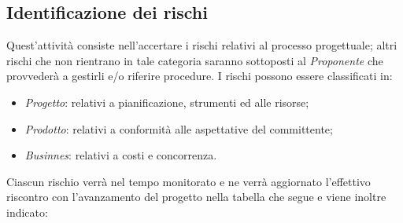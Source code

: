 \documentclass[12pt,a4paper,titlepage]{article}
\begin{document}
	\subsection{Identificazione dei rischi}
		Quest'attività consiste nell'accertare i rischi relativi al processo progettuale; altri rischi che non rientrano in tale categoria saranno sottoposti al \textit{Proponente} che provvederà a gestirli e/o riferire procedure.
		I rischi possono essere classificati in:
		\begin{itemize}
			\item \textit{Progetto}: relativi a pianificazione, strumenti ed alle risorse;
			\item \textit{Prodotto}: relativi a conformità alle aspettative del committente;
			\item \textit{Businnes}: relativi a costi e concorrenza.
		\end{itemize}
		Ciascun rischio verrà nel tempo monitorato e ne verrà aggiornato l'effettivo riscontro con l'avanzamento del progetto nella tabella che segue e viene inoltre indicato:
\end{document}

